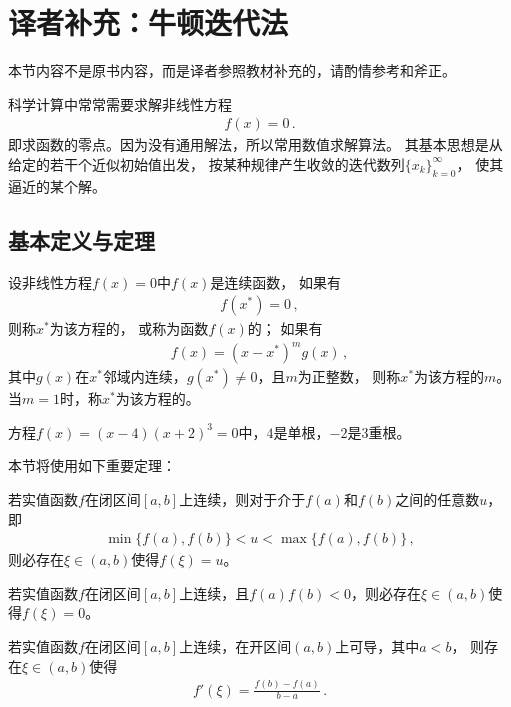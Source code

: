 \section{译者补充：牛顿迭代法}\label{sec:译者补充：牛顿迭代法}
\begin{remark}
    本节内容不是原书内容，而是译者参照教材补充的，请酌情参考和斧正。
\end{remark}

科学计算中常常需要求解非线性方程
\begin{align}\label{eq:02ex0301}
    f(x)=0\, .
\end{align}
即求函数的零点。因为没有通用解法，所以常用数值求解算法。
其基本思想是从给定的若干个近似初始值出发，
按某种规律产生收敛的迭代数列$\{x_k\}_{k=0}^{\infty}$，
使其逼近的某个解。

\subsection{基本定义与定理}\label{sub:基本定义与定理02}
\begin{definition}
    设非线性方程$f(x)=0$中$f(x)$是连续函数，
    如果有
    \begin{align}\label{eq:02ex0302}
        f(x^*)=0\, ,
    \end{align}
    则称$x^*$为该方程的，
    或称为函数$f(x)$的；
    如果有
    \begin{align}\label{eq:02ex0303}
        f(x)=(x-x^*)^mg(x)\, ,
    \end{align}
    其中$g(x)$在$x^*$邻域内连续，$g(x^*)\neq0$，且$m$为正整数，
    则称$x^*$为该方程的$m$。
    当$m=1$时，称$x^*$为该方程的。
\end{definition}

\begin{example}
    方程$f(x)=(x-4)(x+2)^3=0$中，$4$是单根，$-2$是3重根。
\end{example}

本节将使用如下重要定理：
\begin{theorem}
    若实值函数$f$在闭区间$[a,b]$上连续，则对于介于$f(a)$和$f(b)$之间的任意数$u$，即
    \begin{align}\label{eq:02ex0304}
        \min\{f(a),f(b)\}<u<\max\{f(a),f(b)\}\, ,
    \end{align}
    则必存在$\xi\in(a,b)$使得$f(\xi)=u$。
\end{theorem}
\begin{corollary}
    若实值函数$f$在闭区间$[a,b]$上连续，且$f(a)f(b)<0$，则必存在$\xi\in(a,b)$使得$f(\xi)=0$。
\end{corollary}
\begin{theorem}
    若实值函数$f$在闭区间$[a,b]$上连续，在开区间$(a,b)$上可导，其中$a<b$，
    则存在$\xi\in(a,b)$使得
    \begin{align}\label{eq:02ex0305}
        f'(\xi)=\frac{f(b)-f(a)}{b-a}\, .
    \end{align}
\end{theorem}

